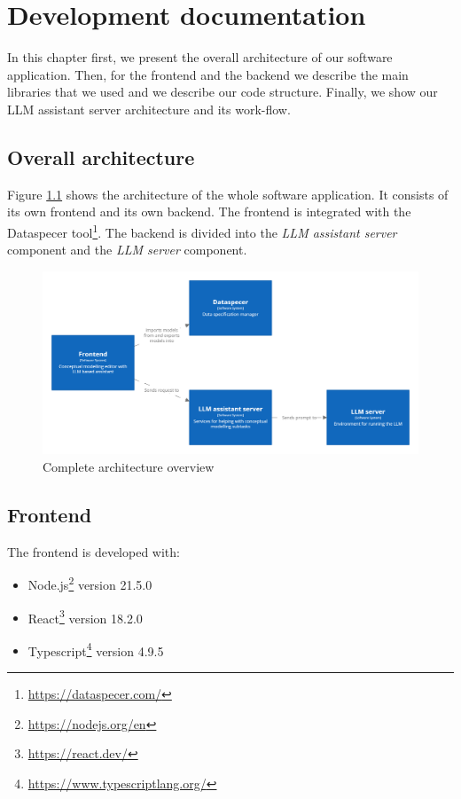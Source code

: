 \chapter{Development documentation}
\label{chap:development_documentation}

In this chapter first, we present the overall architecture of our software application. Then, for the frontend and the backend we describe the main libraries that we used and we describe our code structure. Finally, we show our LLM assistant server architecture and its work-flow.


\section{Overall architecture}

Figure \ref{fig:complete_overview} shows the architecture of the whole software application. It consists of its own frontend and its own backend. The frontend is integrated with the Dataspecer tool\footnote{\url{https://dataspecer.com/}}. The backend is divided into the \emph{LLM assistant server} component and the \emph{LLM server} component.

\begin{figure}[!h]
    \includegraphics[scale=0.20]{../docs/images/architecture/complete-overview.png}
    \caption{\centering Complete architecture overview}
    \label{fig:complete_overview}
\end{figure}


\section{Frontend}

\noindent{}The frontend is developed with:
\begin{itemize}
\item Node.js\footnote{\url{https://nodejs.org/en}} version 21.5.0
\item React\footnote{\url{https://react.dev/}} version 18.2.0
\item Typescript\footnote{\url{https://www.typescriptlang.org/}} version 4.9.5
\end{itemize}


